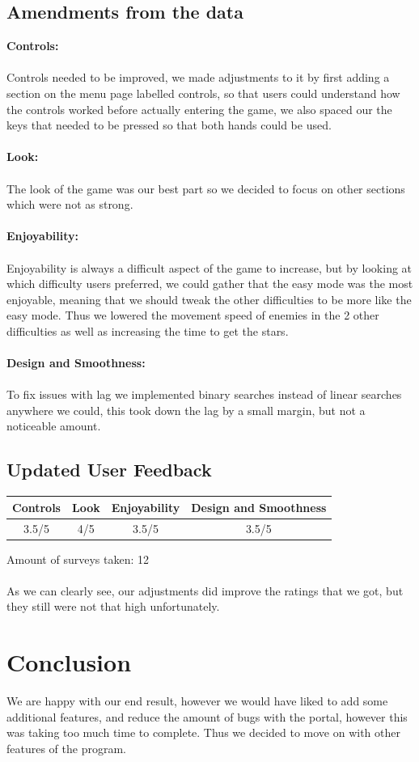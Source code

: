 \documentclass{article}
\begin{document}
	\subsection{Amendments from the data}
	\textbf{Controls:} \\ \\
	Controls needed to be improved, we made adjustments to it by
	first adding a section on the menu page labelled controls,
	so that users could understand how the controls worked before actually entering the game,
	we also spaced our the keys that needed to be pressed so that both hands could be used. \\ \\
	\textbf{Look:} \\ \\
	The look of the game was our best part so we decided to focus on other sections which were not as strong. \\ \\
	\textbf{Enjoyability:} \\ \\
	Enjoyability is always a difficult aspect of the game to increase, but by looking at which difficulty users preferred,
	we could gather that the easy mode was the most enjoyable, meaning that we should tweak the other difficulties to be more like the easy mode. Thus we lowered the movement speed of enemies in the 2 other difficulties as well as increasing the time to get the stars. \\ \\
	\textbf{Design and Smoothness:} \\ \\
	To fix issues with lag we implemented binary searches instead of linear searches anywhere we could, this took down the lag by a small margin, but not a noticeable amount.
	
	\subsection{Updated User Feedback}
	\begin{center}
		\begin{tabular}{ |c|c|c|c| } 
			\hline
			Controls & Look & Enjoyability & Design and Smoothness  \\ 
			\hline
			3.5/5 & 4/5 & 3.5/5 & 3.5/5\\ 
			\hline
		\end{tabular}
	\end{center}
	Amount of surveys taken: 12 \\ \\
	As we can clearly see, our adjustments did improve the ratings that we got, but they still were not that high unfortunately.
	
	\section{Conclusion}
	We are happy with our end result, however we would have liked to add some additional features, and reduce the amount of bugs with the portal, however this was taking too much time to complete. Thus we decided to move on with other features of the program. 
	
\end{document}
